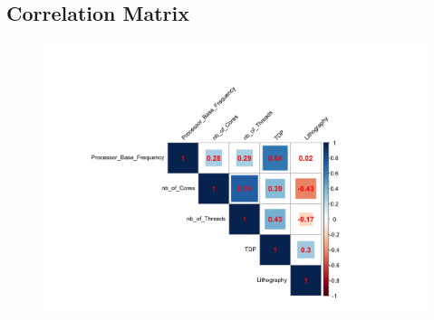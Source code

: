 \subsection{Correlation Matrix}
\begin{figure}[H]
    \begin{center}
    \includegraphics[width=14cm]{graphics/correlation_matrix.png}
    \end{center}
\end{figure}

